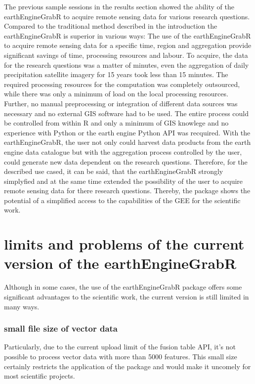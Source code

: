 \documentclass[11pt,twoside,a4paper,final]{report}
\begin{document}
The previous sample sessions in the results section showed the ability of the earthEngineGrabR to acquire remote sensing data for various research questions.
Compared to the traditional method described in the introduction the earthEngineGrabR is superior in various ways:
The use of the earthEngineGrabR to acquire remote sensing data for a specific time, region and aggregation provide significant savings of time, processing resources and labour. To acquire, the data for the research questions was a matter of minutes, even the aggregation of daily precipitation satellite imagery for 15 years took less than 15 minutes. The required processing resources for the computation was completely outsourced, while there was only a minimum of load on the local processing resources. Further, no manual preprocessing or integration of different data sources was necessary and no external GIS software had to be used. The entire process could be controlled from within R and only a minimum of GIS knowlege and no experience with Python or the earth engine Python API was recquired. With the earthEngineGrabR, the user not only could harvest data products from the earth engine data catalogue but with the aggregation process controlled by the user, could generate new data dependent on the research questions. 
Therefore, for the described use cased, it can be said, that the earthEngineGrabR strongly simplyfied and at the same time extended the possibility of the user to acquire remote sensing data for there research questions.
Thereby, the package shows the potential of a simplified access to the capabilities of the GEE for the scientific work.

\section{limits and problems of the current version of the earthEngineGrabR}

Although in some cases, the use of the earthEngineGrabR package offers some significant advantages to the scientific work, the current version is still limited in many ways. 

\subsubsection{small file size of vector data}

Particularly, due to the current upload limit of the fusion table API, it's not possible to process vector data with more than 5000 features. This small size certainly restricts the application of the package and would make it uncomely for most scientific projects. 
 
\end{document}
